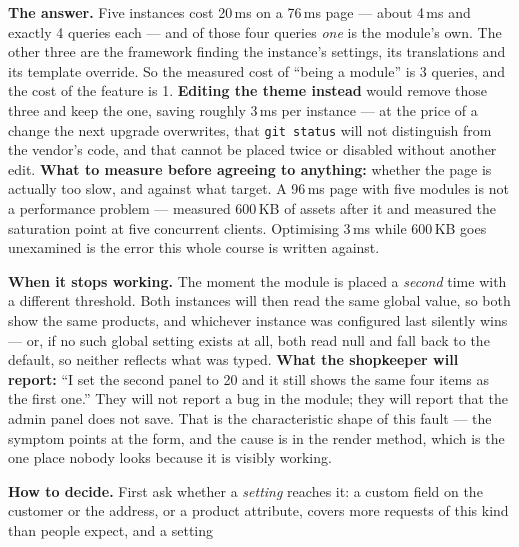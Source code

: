 \begin{ans}
  \item \textbf{The answer.} Five instances cost 20\,ms on a 76\,ms page ---
        about 4\,ms and exactly 4 queries each --- and of those four queries
        \emph{one} is the module's own. The other three are the framework
        finding the instance's settings, its translations and its template
        override. So the measured cost of ``being a module'' is 3 queries, and
        the cost of the feature is 1. \textbf{Editing the theme instead} would
        remove those three and keep the one, saving roughly 3\,ms per instance
        --- at the price of a change the next upgrade overwrites, that
        \texttt{git status} will not distinguish from the vendor's code, and
        that cannot be placed twice or disabled without another edit.
        \textbf{What to measure before agreeing to anything:} whether the page
        is actually too slow, and against what target. A 96\,ms page with five
        modules is not a performance problem ---  measured 600\,KB of
        assets after it and  measured the saturation point at
        five concurrent clients. Optimising 3\,ms while 600\,KB goes unexamined
        is the error this whole course is written against.
  \item \textbf{When it stops working.} The moment the module is placed a
        \emph{second} time with a different threshold. Both instances will then
        read the same global value, so both show the same products, and
        whichever instance was configured last silently wins --- or, if no such
        global setting exists at all, both read null and fall back to the
        default, so neither reflects what was typed. \textbf{What the
        shopkeeper will report:} ``I set the second panel to 20 and it still
        shows the same four items as the first one.'' They will not report a
        bug in the module; they will report that the admin panel does not save.
        That is the characteristic shape of this fault --- the symptom points
        at the form, and the cause is in the render method, which is the one
        place nobody looks because it is visibly working.
  \item \textbf{How to decide.} First ask whether a \emph{setting} reaches it:
        a custom field on the customer or the address, or a product attribute,
        covers more requests of this kind than people expect, and a setting

\end{ans}
